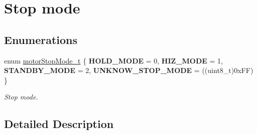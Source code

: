 \hypertarget{group___stop__mode}{}\section{Stop mode}
\label{group___stop__mode}
\subsection*{Enumerations}
\begin{DoxyCompactItemize}
\item 
\mbox{\label{group___stop__mode_ga48c6e38e969d0dbffe3d66b58df2c7d8}} 
enum \mbox{\hyperlink{group___stop__mode_ga48c6e38e969d0dbffe3d66b58df2c7d8}{motor\+Stop\+Mode\+\_\+t}} \{ {\bfseries H\+O\+L\+D\+\_\+\+M\+O\+DE} = 0, 
{\bfseries H\+I\+Z\+\_\+\+M\+O\+DE} = 1, 
{\bfseries S\+T\+A\+N\+D\+B\+Y\+\_\+\+M\+O\+DE} = 2, 
{\bfseries U\+N\+K\+N\+O\+W\+\_\+\+S\+T\+O\+P\+\_\+\+M\+O\+DE} = ((uint8\+\_\+t)0x\+FF)
 \}
\begin{DoxyCompactList}\small\item\em Stop mode. \end{DoxyCompactList}\end{DoxyCompactItemize}


\subsection{Detailed Description}
